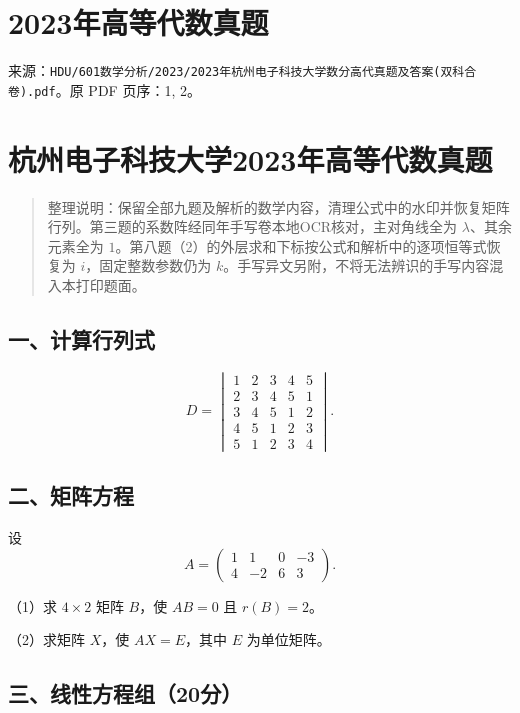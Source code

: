 \documentclass[11pt,fontset=fandol]{ctexart}
\begin{document}
\section{2023年高等代数真题}\label{ux5e74ux9ad8ux7b49ux4ee3ux6570ux771fux9898}

来源：\texttt{HDU/601数学分析/2023/2023年杭州电子科技大学数分高代真题及答案(双科合卷).pdf}。原
PDF 页序：1, 2。

\section{杭州电子科技大学2023年高等代数真题}\label{ux676dux5ddeux7535ux5b50ux79d1ux6280ux5927ux5b662023ux5e74ux9ad8ux7b49ux4ee3ux6570ux771fux9898}

\begin{quote}
整理说明：保留全部九题及解析的数学内容，清理公式中的水印并恢复矩阵行列。第三题的系数阵经同年手写卷本地OCR核对，主对角线全为
\(\lambda\)、其余元素全为
\(1\)。第八题（2）的外层求和下标按公式和解析中的逐项恒等式恢复为
\(i\)，固定整数参数仍为
\(k\)。手写异文另附，不将无法辨识的手写内容混入本打印题面。
\end{quote}

\subsection{一、计算行列式}\label{ux4e00ux8ba1ux7b97ux884cux5217ux5f0f}

\[
D=\begin{vmatrix}
1&2&3&4&5\\2&3&4&5&1\\3&4&5&1&2\\4&5&1&2&3\\5&1&2&3&4
\end{vmatrix}.
\]

\subsection{二、矩阵方程}\label{ux4e8cux77e9ux9635ux65b9ux7a0b}

设 \[
A=\begin{pmatrix}1&1&0&-3\\4&-2&6&3\end{pmatrix}.
\]

（1）求 \(4\times2\) 矩阵 \(B\)，使 \(AB=0\) 且 \(r(B)=2\)。

（2）求矩阵 \(X\)，使 \(AX=E\)，其中 \(E\) 为单位矩阵。

\subsection{三、线性方程组（20分）}\label{ux4e09ux7ebfux6027ux65b9ux7a0bux7ec420ux5206}
\end{document}
